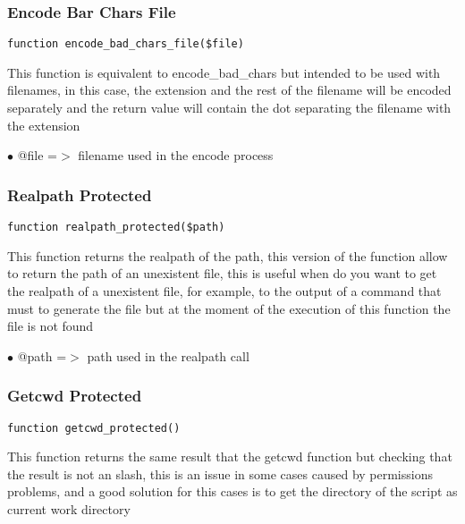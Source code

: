 \documentclass[a4paper]{article}
\begin{document}
\hypertarget{toc135}{}
\subsubsection{Encode Bar Chars File}

\begin{lstlisting}
function encode_bad_chars_file($file)
\end{lstlisting}

This function is equivalent to encode\_bad\_chars but intended to be used
with filenames, in this case, the extension and the rest of the filename
will be encoded separately and the return value will contain the dot
separating the filename with the extension

\begin{compactitem}
\item[\color{myblue}$\bullet$] @file =$>$ filename used in the encode process
\end{compactitem}

\hypertarget{toc136}{}
\subsubsection{Realpath Protected}

\begin{lstlisting}
function realpath_protected($path)
\end{lstlisting}

This function returns the realpath of the path, this version of the function
allow to return the path of an unexistent file, this is useful when do you
want to get the realpath of a unexistent file, for example, to the output of
a command that must to generate the file but at the moment of the execution
of this function the file is not found

\begin{compactitem}
\item[\color{myblue}$\bullet$] @path =$>$ path used in the realpath call
\end{compactitem}

\hypertarget{toc137}{}
\subsubsection{Getcwd Protected}

\begin{lstlisting}
function getcwd_protected()
\end{lstlisting}

This function returns the same result that the getcwd function but checking
that the result is not an slash, this is an issue in some cases caused by
permissions problems, and a good solution for this cases is to get the directory
of the script as current work directory
\end{document}
